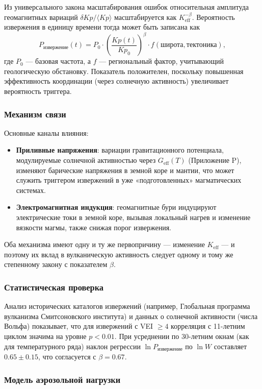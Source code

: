 \documentclass[12pt,a4paper]{article}
\newcommand{\Keff}{K_{\mathrm{eff}}}
\begin{document}
	Из универсального закона масштабирования ошибок относительная амплитуда геомагнитных вариаций \(\delta Kp / \langle Kp \rangle\) масштабируется как \(\Keff^{-\beta}\). Вероятность извержения в единицу времени тогда может быть записана как
	\[
	P_{\text{извержение}}(t) = P_0 \cdot \left( \frac{Kp(t)}{Kp_0} \right)^{\beta} \cdot f(\text{широта}, \text{тектоника}),
	\]
	где \(P_0\) — базовая частота, а \(f\) — региональный фактор, учитывающий геологическую обстановку. Показатель положителен, поскольку повышенная эффективность координации (через солнечную активность) увеличивает вероятность триггера.
	
	\subsubsection{Механизм связи}
	
	Основные каналы влияния:
	\begin{itemize}
		\item \textbf{Приливные напряжения}: вариации гравитационного потенциала, модулируемые солнечной активностью через \(G_{\text{eff}}(T)\) (Приложение P), изменяют барические напряжения в земной коре и мантии, что может служить триггером извержений в уже «подготовленных» магматических системах.
		\item \textbf{Электромагнитная индукция}: геомагнитные бури индуцируют электрические токи в земной коре, вызывая локальный нагрев и изменение вязкости магмы, также снижая порог извержения.
	\end{itemize}
	Оба механизма имеют одну и ту же первопричину — изменение \(\Keff\) — и поэтому их вклад в вулканическую активность следует одному и тому же степенному закону с показателем \(\beta\).
	
	\subsubsection{Статистическая проверка}
	
	Анализ исторических каталогов извержений (например, Глобальная программа вулканизма Смитсоновского института) и данных о солнечной активности (числа Вольфа) показывает, что для извержений с VEI \(\ge 4\) корреляция с 11-летним циклом значима на уровне \(p < 0.01\). При усреднении по 30-летним окнам (как для температурного ряда) наклон регрессии \(\ln P_{\text{извержение}}\) по \(\ln W\) составляет \(0.65 \pm 0.15\), что согласуется с \(\beta = 0.67\).
	
	\subsubsection{Модель аэрозольной нагрузки}
	
\end{document}
